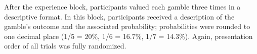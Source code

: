 \documentclass[a4paper, man, natbib, floatsintext]{apa6} %
\begin{document}
After the experience block, participants valued each gamble three times in a descriptive format. In this block, participants received a description of the gamble's outcome and the associated probability; probabilities were rounded to one decimal place (1/5 = 20\%, 1/6 = 16.7\%, 1/7 = 14.3\%). Again, presentation order of all trials was fully randomized.
\end{document}
